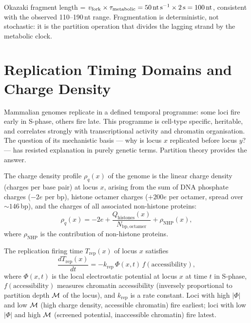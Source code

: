 \begin{keyresult}
Okazaki fragment length = $v_{\mathrm{fork}} \times \tau_{\mathrm{metabolic}}
= 50\,\text{nt\,s}^{-1} \times 2\,\text{s} = 100\,\text{nt}$,
consistent with the observed 110--190\,nt range.
Fragmentation is deterministic, not stochastic: it is the partition operation
that divides the lagging strand by the metabolic clock.
\end{keyresult}

\section{Replication Timing Domains and Charge Density}
\label{sec:replication_timing}

Mammalian genomes replicate in a defined temporal programme: some loci fire
early in S-phase, others fire late. This programme is cell-type specific,
heritable, and correlates strongly with transcriptional activity and chromatin
organisation. The question of its mechanistic basis --- why is locus $x$
replicated before locus $y$? --- has resisted explanation in purely genetic
terms. Partition theory provides the answer.

\begin{definition}
\label{def:charge_profile}
The charge density profile $\rho_q(x)$ of the genome is the linear charge
density (charges per base pair) at locus $x$, arising from the sum of DNA
phosphate charges ($-2e$ per bp), histone octamer charges ($+200e$ per
octamer, spread over $\sim 146$\,bp), and the charges of all associated
non-histone proteins:
\begin{equation}
  \rho_q(x) = -2e + \frac{Q_{\mathrm{histones}}(x)}{N_{\mathrm{bp,octamer}}}
  + \rho_{\mathrm{NHP}}(x),
  \label{eq:charge_profile}
\end{equation}
where $\rho_{\mathrm{NHP}}$ is the contribution of non-histone proteins.
\end{definition}

\begin{theorem}
\label{thm:replication_timing}
The replication firing time $T_{\mathrm{rep}}(x)$ of locus $x$ satisfies
\begin{equation}
  \frac{dT_{\mathrm{rep}}(x)}{dt} = -k_{\mathrm{rep}}\,\Phi(x,t)\,f(\text{accessibility}),
  \label{eq:rep_timing_ode}
\end{equation}
where $\Phi(x,t)$ is the local electrostatic potential at locus $x$ at time
$t$ in S-phase, $f(\text{accessibility})$ measures chromatin accessibility
(inversely proportional to partition depth $\mathcal{M}$ of the locus), and
$k_{\mathrm{rep}}$ is a rate constant. Loci with high $|\Phi|$ and low $\mathcal{M}$
(high charge density, accessible chromatin) fire earliest; loci with low $|\Phi|$
and high $\mathcal{M}$ (screened potential, inaccessible chromatin) fire latest.
\end{theorem}

